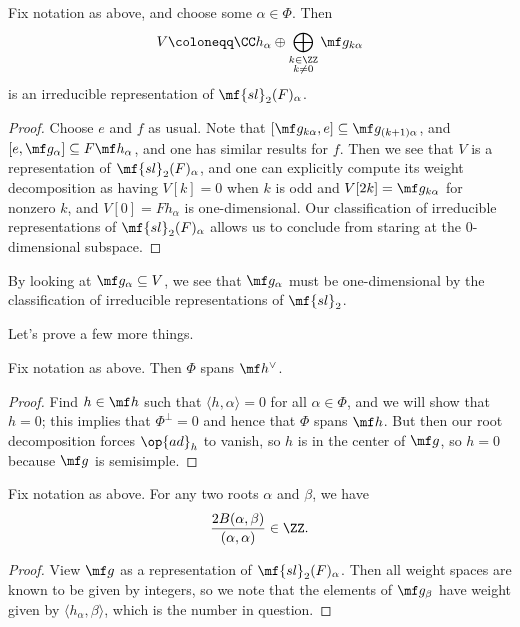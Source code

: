 \documentclass[../notes.tex]{subfiles}
\begin{document}
\begin{lemma}
	Fix notation as above, and choose some $\alpha\in\Phi$. Then
	\[V\coloneqq\CC h_\alpha\oplus\bigoplus_{\substack{k\in\ZZ\\k\ne0}}\mf g_{k\alpha}\]
	is an irreducible representation of $\mf{sl}_2(F)_\alpha$.
\end{lemma}
\begin{proof}
	Choose $e$ and $f$ as usual. Note that $[\mf g_{k\alpha},e]\subseteq\mf g_{(k+1)\alpha}$, and $[e,\mf g_\alpha]\subseteq F\mf h_\alpha$, and one has similar results for $f$. Then we see that $V$ is a representation of $\mf{sl}_2(F)_\alpha$, and one can explicitly compute its weight decomposition as having $V[k]=0$ when $k$ is odd and $V[2k]=\mf g_{k\alpha}$ for nonzero $k$, and $V[0]=Fh_\alpha$ is one-dimensional. Our classification of irreducible representations of $\mf{sl}_2(F)_\alpha$ allows us to conclude from staring at the $0$-dimensional subspace.
\end{proof}
\begin{remark}
	By looking at $\mf g_\alpha\subseteq V$, we see that $\mf g_\alpha$ must be one-dimensional by the classification of irreducible representations of $\mf{sl}_2$.
\end{remark}
Let's prove a few more things.
	
\begin{lemma}
	Fix notation as above. Then $\Phi$ spans $\mf h^\lor$.
\end{lemma}
\begin{proof}
	Find $h\in\mf h$ such that $\langle h,\alpha\rangle=0$ for all $\alpha\in\Phi$, and we will show that $h=0$; this implies that $\Phi^\perp=0$ and hence that $\Phi$ spans $\mf h$. But then our root decomposition forces $\op{ad}_h$ to vanish, so $h$ is in the center of $\mf g$, so $h=0$ because $\mf g$ is semisimple.
\end{proof}
\begin{lemma}
	Fix notation as above. For any two roots $\alpha$ and $\beta$, we have
	\[\frac{2B(\alpha,\beta)}{(\alpha,\alpha)}\in\ZZ.\]
\end{lemma}
\begin{proof}
	View $\mf g$ as a representation of $\mf{sl}_2(F)_\alpha$. Then all weight spaces are known to be given by integers, so we note that the elements of $\mf g_\beta$ have weight given by $\langle h_\alpha,\beta\rangle$, which is the number in question.
\end{proof}
\end{document}

